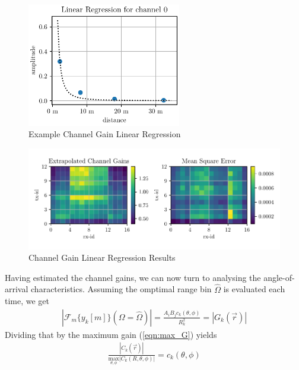 \begin{figure}
    \centering
    \includegraphics[width=0.6\textwidth]{../figures/ch0_amplitude_linreg.pdf}
    \caption{Example Channel Gain Linear Regression}
    \label{fig:ch0_amp_linreg}
\end{figure}

\begin{figure}
    \centering
    \includegraphics[width=\textwidth]{../figures/amplitude_linreg.pdf}
    \caption{Channel Gain Linear Regression Results}
    \label{fig:amp_linreg}
\end{figure}

Having estimated the channel gains, we can now turn to analysing the angle-of-arrival characteristics.
Assuming the omptimal range bin $\hat \Omega$ is evaluated each time, we get
\begin{align}
    \left|\mathcal{F}_m\{y_k[m]\}(\Omega = \hat \Omega)  \right| =  \frac{A_iB_jc_k(\theta,\phi)}{R_{k}^2} =  |G_k(\vec r)|
\end{align}
Dividing that by the maximum gain (\ref{eqn:max_G}) yields
\begin{align}
    \frac {|C_k(\vec r)|}{\underset{\theta,\phi}{\text{max}} |C_k(R,\theta,\phi)|}  = c_k(\theta,\phi)
\end{align}

